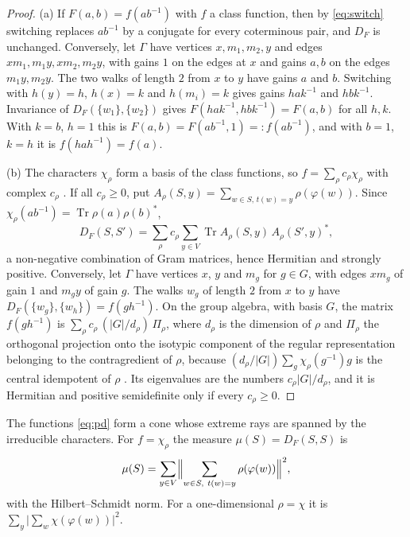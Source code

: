 \begin{proof}
(a) If $F(a,b)=f(ab^{-1})$ with $f$ a class function, then by \eqref{eq:switch} switching replaces $ab^{-1}$ by a conjugate for every coterminous pair, and $D_F$ is unchanged. Conversely, let $\Gamma$ have vertices $x,m_1,m_2,y$ and edges $xm_1,m_1y,xm_2,m_2y$, with gains $1$ on the edges at $x$ and gains $a,b$ on the edges $m_1y,m_2y$. The two walks of length $2$ from $x$ to $y$ have gains $a$ and $b$. Switching with $h(y)=h$, $h(x)=k$ and $h(m_i)=k$ gives gains $hak^{-1}$ and $hbk^{-1}$. Invariance of $D_F(\{w_1\},\{w_2\})$ gives $F(hak^{-1},hbk^{-1})=F(a,b)$ for all $h,k$. With $k=b$, $h=1$ this is $F(a,b)=F(ab^{-1},1)=:f(ab^{-1})$, and with $b=1$, $k=h$ it is $f(hah^{-1})=f(a)$.

(b) The characters $\chi_\rho$ form a basis of the class functions, so $f=\sum_\rho c_\rho\chi_\rho$ with complex $c_\rho$ \cite{serre}. If all $c_\rho\ge0$, put $A_\rho(S,y)=\sum_{w\in S,\,t(w)=y}\rho(\varphi(w))$. Since $\chi_\rho(ab^{-1})=\operatorname{Tr}\rho(a)\rho(b)^*$,
\begin{equation}\label{eq:rep}
D_F(S,S')=\sum_\rho c_\rho\sum_{y\in V}\operatorname{Tr}A_\rho(S,y)\,A_\rho(S',y)^* ,
\end{equation}
a non-negative combination of Gram matrices, hence Hermitian and strongly positive. Conversely, let $\Gamma$ have vertices $x$, $y$ and $m_g$ for $g\in G$, with edges $xm_g$ of gain $1$ and $m_gy$ of gain $g$. The walks $w_g$ of length $2$ from $x$ to $y$ have $D_F(\{w_g\},\{w_h\})=f(gh^{-1})$. On the group algebra, with basis $G$, the matrix $f(gh^{-1})$ is $\sum_\rho c_\rho\,(|G|/d_\rho)\,\Pi_\rho$, where $d_\rho$ is the dimension of $\rho$ and $\Pi_\rho$ the orthogonal projection onto the isotypic component of the regular representation belonging to the contragredient of $\rho$, because $(d_\rho/|G|)\sum_g\chi_\rho(g^{-1})g$ is the central idempotent of $\rho$ \cite{serre}. Its eigenvalues are the numbers $c_\rho|G|/d_\rho$, and it is Hermitian and positive semidefinite only if every $c_\rho\ge0$.
\end{proof}

\begin{corollary}\label{cor:born}
The functions \eqref{eq:pd} form a cone whose extreme rays are spanned by the irreducible characters. For $f=\chi_\rho$ the measure $\mu(S)=D_F(S,S)$ is
\begin{equation}\label{eq:born}
\mu(S)=\sum_{y\in V}\Bigl\lVert\sum_{w\in S,\ t(w)=y}\rho(\varphi(w))\Bigr\rVert^2 ,
\end{equation}
with the Hilbert--Schmidt norm. For a one-dimensional $\rho=\chi$ it is $\sum_y\bigl|\sum_w\chi(\varphi(w))\bigr|^2$.
\end{corollary}


